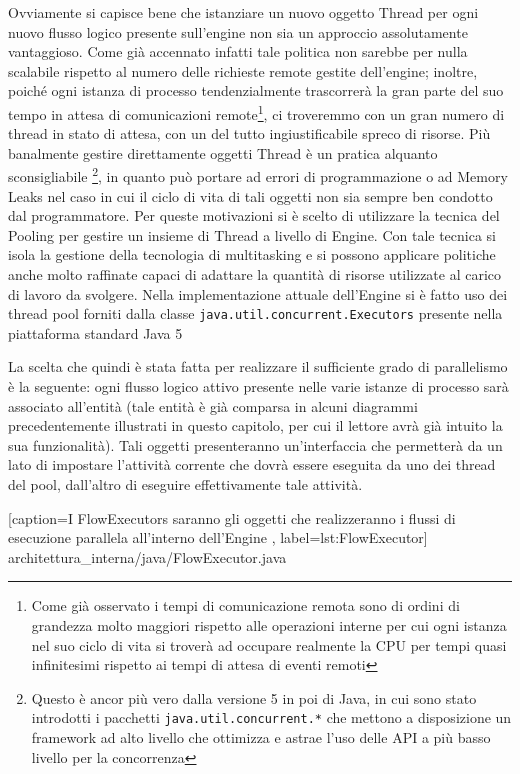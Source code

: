Ovviamente si capisce bene che istanziare un nuovo oggetto Thread per ogni nuovo
flusso logico presente sull'engine non sia un approccio assolutamente
vantaggioso. Come già accennato infatti tale politica non sarebbe per nulla
scalabile rispetto al numero delle richieste remote gestite dell'engine; inoltre,
poiché ogni istanza di processo tendenzialmente trascorrerà la gran parte del suo
tempo in attesa di comunicazioni remote\footnote{Come già osservato i tempi di
comunicazione remota sono di ordini di grandezza molto maggiori rispetto alle
operazioni interne per cui ogni istanza nel suo ciclo di vita si troverà ad
occupare realmente la CPU per tempi quasi infinitesimi rispetto ai tempi di
attesa di eventi remoti}, ci troveremmo con un gran numero di thread in stato di
attesa, con un del tutto ingiustificabile spreco di risorse. Più banalmente
gestire direttamente oggetti Thread \`e un pratica alquanto sconsigliabile
\footnote{Questo \`e ancor pi\`u vero dalla versione 5 in poi di Java, in cui
sono stato introdotti i pacchetti \texttt{java.util.concurrent.*} che mettono a
disposizione un framework ad alto livello che ottimizza e astrae l'uso delle API
a più basso livello per la concorrenza}, in quanto può portare ad errori di
programmazione o ad Memory Leaks nel caso in cui il ciclo di vita di tali oggetti
non sia sempre ben condotto dal programmatore. Per queste motivazioni si \`e
scelto di utilizzare la tecnica del Pooling per gestire un insieme di Thread a
livello di Engine. Con tale tecnica si isola la gestione della tecnologia di
multitasking e si possono applicare politiche anche molto raffinate capaci di
adattare la quantità di risorse utilizzate al carico di lavoro da svolgere. Nella
implementazione attuale dell'Engine si \`e fatto uso dei thread pool forniti
dalla classe \texttt{java.util.concurrent.Executors} presente nella piattaforma
standard Java 5
 
La scelta che quindi \`e stata fatta per realizzare il sufficiente grado di
parallelismo \`e la seguente: ogni flusso logico attivo presente nelle varie istanze di
processo sarà associato all'entità  (tale entità \`e già
comparsa in alcuni diagrammi precedentemente illustrati in questo capitolo, per
cui il lettore avrà già intuito la sua funzionalità). Tali oggetti
presenteranno un'interfaccia che permetterà da un lato di impostare l'attività corrente che
dovrà essere eseguita da uno dei thread del pool, dall'altro di eseguire
effettivamente tale attività.


[caption={I FlowExecutors saranno gli oggetti che realizzeranno i flussi di
esecuzione parallela all'interno dell'Engine }, label=lst:FlowExecutor]
{architettura_interna/java/FlowExecutor.java}

